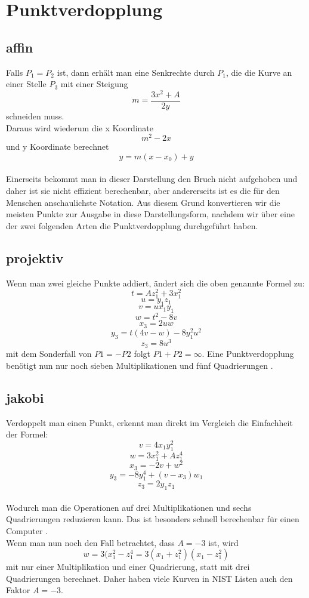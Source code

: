\section{Punktverdopplung}
\subsection{affin}
Falls \(P_1 = P_2\) ist, dann erhält man eine Senkrechte durch \(P_1\), die die Kurve an einer Stelle \(P_3\) mit einer Steigung \[m = \frac{3x^2+A}{2y}\] schneiden muss.\\
Daraus wird wiederum die x Koordinate \[m^2-2x\] und y Koordinate berechnet \[y = m(x - x_0)+y\]\\ Einerseits bekommt man in dieser Darstellung den Bruch nicht aufgehoben und daher ist sie nicht effizient berechenbar, aber andererseits ist es die für den Menschen anschaulichste Notation. Aus diesem Grund konvertieren wir die meisten Punkte zur Ausgabe in diese Darstellungsform, nachdem wir über eine der zwei folgenden Arten die Punktverdopplung durchgeführt haben.
\subsection{projektiv}
Wenn man zwei gleiche Punkte addiert, ändert sich die oben genannte Formel zu:
\[t = Az_1^2 + 3x_1^2\] \[u = y_1z_1\] \[v = ux_1y_1\] \[w = t^2 - 8v\] \[x_3 = 2uw\] \[y_3 = t(4v-w)- 8y_1^2u^2\] \[z_3 = 8u^3\] mit dem Sonderfall von \(P1 = -P2\) folgt \(P1 + P2 = \infty\). Eine Punktverdopplung benötigt nun nur noch sieben Multiplikationen und fünf Quadrierungen  \cite{Washington2003}.
\subsection{jakobi}
Verdoppelt man einen Punkt, erkennt man direkt im Vergleich die Einfachheit der Formel:
\[v = 4x_1y_1^2\] \[w = 3x_1^2 + Az_1^4\] \[x_3 = -2v + w^2\] \[y_3 = -8y_1^4 + (v-x_3)w_1\] \[z_3 = 2y_1z_1\]\\ 
Wodurch man die Operationen auf drei Multiplikationen und sechs Quadrierungen reduzieren kann. Das ist besonders schnell berechenbar für einen Computer \cite{Washington2003}.\\
Wenn man nun noch den Fall betrachtet, dass \(A = -3\) ist, wird \[w = 3(x_1^2 - z_1^4 = 3(x_1 + z_1^2)(x_1 - z_1^2)\] mit nur einer Multiplikation und einer Quadrierung, statt mit drei Quadrierungen berechnet. Daher haben viele Kurven in NIST Listen auch den Faktor \(A = -3\).